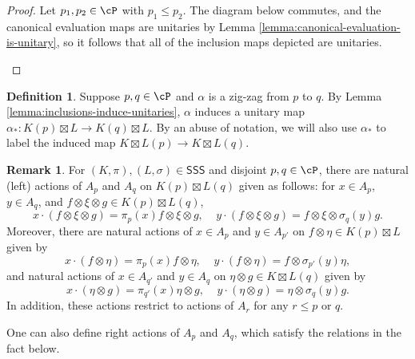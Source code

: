 \documentclass[11pt,reqno]{amsart}
\newcommand{\SSS}{\mathsf{SSS}}
\numberwithin{equation}{section}
\theoremstyle{plain}
\theoremstyle{definition}
\newtheorem{definition}[equation]{Definition}
\newtheorem{remark}[equation]{Remark}
\begin{document}
\begin{proof}
    Let $p_1,p_2\in{\cP}$ with $p_1\leq p_2$. The diagram below commutes, and the canonical evaluation maps are unitaries by Lemma \ref{lemma:canonical-evaluation-is-unitary}, so it follows that all of the inclusion maps depicted are unitaries. 
    \begin{center}
\end{center}
\end{proof}

\begin{definition}\label{def:zigzagmaps}
    Suppose $p,q\in{\cP}$ and $\alpha$ is a zig-zag from $p$ to $q$. By Lemma \ref{lemma:inclusions-induce-unitaries}, $\alpha$ induces a unitary map $\alpha_*:K(p)\boxtimes L\to K(q)\boxtimes L$. By an abuse of notation, we will also use $\alpha_*$ to label the induced map $K\boxtimes L(p)\to K\boxtimes L(q)$.
\end{definition}

\begin{remark}\label{remark:natural-actions}
    For $(K,\pi),(L,\sigma)\in\SSS$ and disjoint $p,q\in{\cP}$, there are natural (left) actions of $A_p$ and $A_q$ on $K(p)\boxtimes L(q)$ given as follows: for $x\in A_p$, $y\in A_q$, and $f\otimes\xi\otimes g\in K(p)\boxtimes L(q)$,
    \[
    x\cdot(f\otimes\xi\otimes g)=\pi_p(x)f\otimes\xi\otimes g,\;\;\;\;y\cdot(f\otimes\xi\otimes g)=f\otimes\xi\otimes \sigma_q(y)g.
    \]
    Moreover, there are natural actions of $x\in A_{p}$ and $y\in A_{p'}$ on $f\otimes\eta\in K(p)\boxtimes L$ given by
    \[
    x\cdot(f\otimes\eta)=\pi_p(x)f\otimes\eta,\;\;\;\; y\cdot(f\otimes\eta)=f\otimes\sigma_{p'}(y)\eta,
    \]
    and natural actions of $x\in A_{q'}$ and $y\in A_{q}$ on $\eta\otimes g\in K\boxtimes L(q)$ given by
    \[
    x\cdot(\eta\otimes g)=\pi_{q'}(x)\eta\otimes g,\;\;\;\; y\cdot(\eta\otimes g)=\eta\otimes\sigma_{q}(y)g.
    \]
    In addition, these actions restrict to actions of $A_r$ for any $r\leq p$ or $q$. 
\end{remark}
One can also define right actions of $A_p$ and $A_q$, which satisfy the relations in the fact below.
\end{document}
